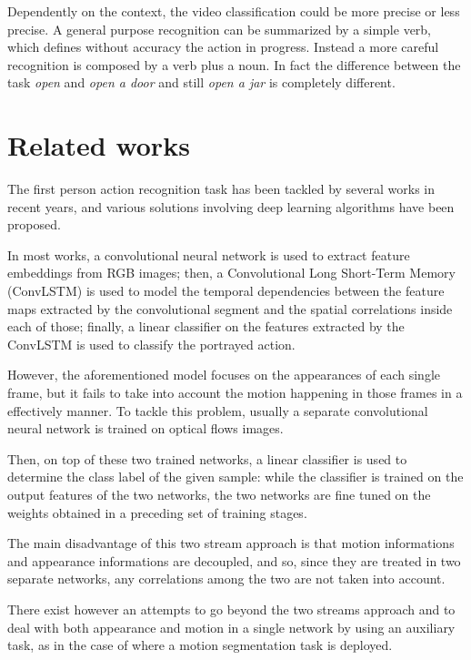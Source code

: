 \documentclass[10pt,twocolumn,letterpaper]{article}
\begin{document}
Dependently on the context, the video classification could be more precise or less precise. A general purpose recognition can be summarized by a simple verb, which defines without accuracy the action in progress. Instead a more careful recognition is composed by a verb plus a noun. In fact the difference between the task \emph{open} and \emph{open a door} and still \emph{open a jar} is completely different.

\section{Related works}

The first person action recognition task has been tackled by several works in recent years, and various solutions involving deep learning algorithms have been proposed.

In most works, a convolutional neural network is used to extract feature embeddings from RGB images; then, a Convolutional Long Short-Term Memory (ConvLSTM) is used to model the temporal dependencies between the feature maps extracted by the convolutional segment and the spatial correlations inside each of those; finally, a linear classifier on the features extracted by the ConvLSTM is used to classify the portrayed action.

However, the aforementioned model focuses on the appearances of each single frame, but it fails to take into account the motion happening in those frames in a effectively manner. To tackle this problem, usually a separate convolutional neural network is trained on optical flows images.

Then, on top of these two trained networks, a linear classifier is used to determine the class label of the given sample: while the classifier is trained on the output features of the two networks, the two networks are fine tuned on the weights obtained in a preceding set of training stages.

The main disadvantage of this two stream approach is that motion informations and appearance informations are decoupled, and so, since they are treated in two separate networks, any correlations among the two are not taken into account.

There exist however an attempts to go beyond the two streams approach and to deal with both appearance and motion in a single network by using an auxiliary task, as in the case of \cite{planamente2020joint} where a motion segmentation task is deployed.
\end{document}
